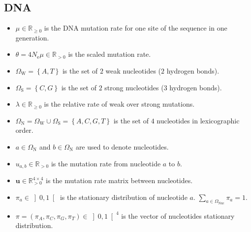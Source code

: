 \documentclass{article}
\newcommand{\Ne}{N_\mathrm{e}}
\newcommand{\SetNuc}{\Omega_{\mathrm{N}}}
\newcommand{\SetWeak}{\Omega_{\mathrm{W}}}
\newcommand{\SetStrong}{\Omega_{\mathrm{S}}}
\begin{document}
    \subsection{DNA}
    \begin{itemize}
        \item $\mu \in \mathbb{R}_{\geq 0}$ is the DNA mutation rate for one site of the sequence in one generation.
        \item $\theta=4 \Ne \mu \in \mathbb{R}_{>0} $ is the scaled mutation rate.
        \item $ \SetWeak = \left\{ A,T \right\} $ is the set of $2$ weak nucleotides ($2$ hydrogen bonds).
        \item $ \SetStrong = \left\{C,G \right\} $ is the set of $2$ strong nucleotides ($3$ hydrogen bonds).
        \item $\lambda \in \mathbb{R}_{\geq 0} $ is the relative rate of weak over strong mutations.
        \item $ \SetNuc = \SetWeak \cup \SetStrong =\left\{ A,C,G,T \right\} $ is the set of $4$ nucleotides in lexicographic order.
        \item $a \in \SetNuc $ and $b \in \SetNuc $ are used to denote nucleotides.
        \item $u_{a,b} \in \mathbb{R}_{> 0}$ is the mutation rate from nucleotide $a$ to $b$.
        \item $\bm{u} \in \mathbb{R}_{> 0}^{4 \times 4} $ is the mutation rate matrix between nucleotides.
        \item $\pi_a \in \left]0,1\right[ $ is the stationary distribution of nucleotide $a$. $\sum_{a \in \Omega_{\mathrm{Nuc}}} \pi_a = 1$.
        \item $\pi = \left(\pi_A , \pi_C , \pi_G , \pi_T \right) \in \left]0,1\right[^4$ is the vector of nucleotides stationary distribution.
    \end{itemize}
\end{document}
